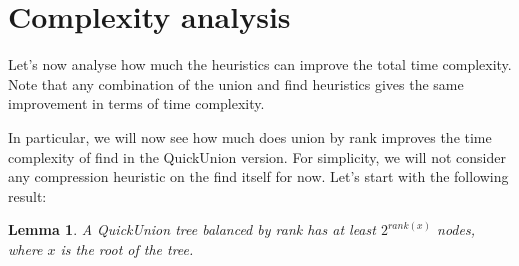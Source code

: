 \documentclass{article}
\newtheorem{lemma}{Lemma}
\begin{document}
\section{Complexity analysis}\label{complex}
Let's now analyse how much the heuristics can improve the total time complexity. Note that any combination of  the union and find heuristics gives the same improvement in terms of time complexity. 

In particular, we will now see
how much does union by rank improves the time complexity of find in the QuickUnion version.
For simplicity, we will not consider any compression heuristic on the find itself for now. 
Let's start with the following result:
\begin{lemma}\label{rank}
    A QuickUnion tree balanced by rank has at least $2^{rank(x)}$ nodes, where $x$ is the root of the tree.
\end{lemma}
\end{document}
